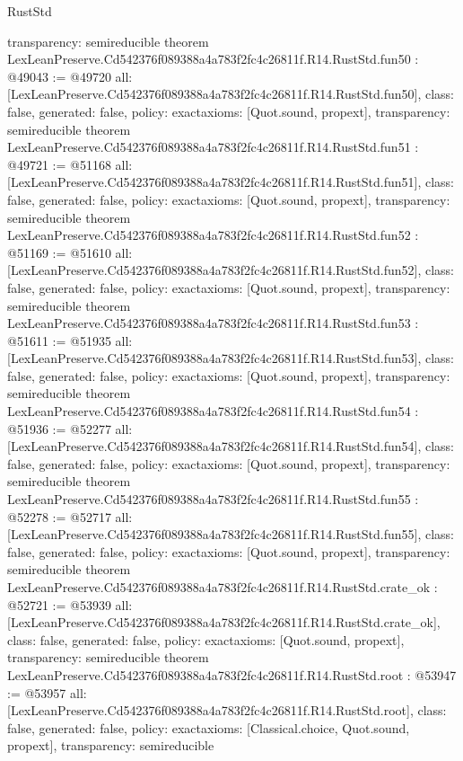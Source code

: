 \begin{lexlean}{RustStd}
\begin{coremodule}
{  transparency: semireducible
}
theorem LexLeanPreserve.Cd542376f089388a4a783f2fc4c26811f.R14.RustStd.fun50 : @49043 := @49720 {
  all: [LexLeanPreserve.Cd542376f089388a4a783f2fc4c26811f.R14.RustStd.fun50],
  class: false,
  generated: false,
  policy: exact{axioms: [Quot.sound, propext]},
  transparency: semireducible
}
theorem LexLeanPreserve.Cd542376f089388a4a783f2fc4c26811f.R14.RustStd.fun51 : @49721 := @51168 {
  all: [LexLeanPreserve.Cd542376f089388a4a783f2fc4c26811f.R14.RustStd.fun51],
  class: false,
  generated: false,
  policy: exact{axioms: [Quot.sound, propext]},
  transparency: semireducible
}
theorem LexLeanPreserve.Cd542376f089388a4a783f2fc4c26811f.R14.RustStd.fun52 : @51169 := @51610 {
  all: [LexLeanPreserve.Cd542376f089388a4a783f2fc4c26811f.R14.RustStd.fun52],
  class: false,
  generated: false,
  policy: exact{axioms: [Quot.sound, propext]},
  transparency: semireducible
}
theorem LexLeanPreserve.Cd542376f089388a4a783f2fc4c26811f.R14.RustStd.fun53 : @51611 := @51935 {
  all: [LexLeanPreserve.Cd542376f089388a4a783f2fc4c26811f.R14.RustStd.fun53],
  class: false,
  generated: false,
  policy: exact{axioms: [Quot.sound, propext]},
  transparency: semireducible
}
theorem LexLeanPreserve.Cd542376f089388a4a783f2fc4c26811f.R14.RustStd.fun54 : @51936 := @52277 {
  all: [LexLeanPreserve.Cd542376f089388a4a783f2fc4c26811f.R14.RustStd.fun54],
  class: false,
  generated: false,
  policy: exact{axioms: [Quot.sound, propext]},
  transparency: semireducible
}
theorem LexLeanPreserve.Cd542376f089388a4a783f2fc4c26811f.R14.RustStd.fun55 : @52278 := @52717 {
  all: [LexLeanPreserve.Cd542376f089388a4a783f2fc4c26811f.R14.RustStd.fun55],
  class: false,
  generated: false,
  policy: exact{axioms: [Quot.sound, propext]},
  transparency: semireducible
}
theorem LexLeanPreserve.Cd542376f089388a4a783f2fc4c26811f.R14.RustStd.crate_ok : @52721 := @53939 {
  all: [LexLeanPreserve.Cd542376f089388a4a783f2fc4c26811f.R14.RustStd.crate_ok],
  class: false,
  generated: false,
  policy: exact{axioms: [Quot.sound, propext]},
  transparency: semireducible
}
theorem LexLeanPreserve.Cd542376f089388a4a783f2fc4c26811f.R14.RustStd.root : @53947 := @53957 {
  all: [LexLeanPreserve.Cd542376f089388a4a783f2fc4c26811f.R14.RustStd.root],
  class: false,
  generated: false,
  policy: exact{axioms: [Classical.choice, Quot.sound, propext]},
  transparency: semireducible
}


\end{coremodule}
\end{lexlean}
